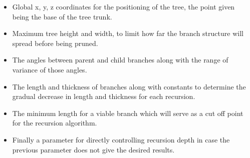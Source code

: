 \documentclass[progress]{cmpreport}
\begin{document}
\begin{itemize}
        \item Global x, y, z coordinates for the positioning of the tree, the point given being 
              the base of the tree trunk.
        \item Maximum tree height and width, to limit how far the branch structure will spread 
              before being pruned.
        \item The angles between parent and child branches along with the range of variance 
              of those angles.
        \item The length and thickness of branches along with constants to determine the gradual 
              decrease in length and thickness for each recursion.
        \item The minimum length for a viable branch which will serve as a cut off point for the 
              recursion algorithm.
        \item Finally a parameter for directly controlling recursion depth in case the previous 
              parameter does not give the desired results.
\end{itemize}

\clearpage

\end{document}
